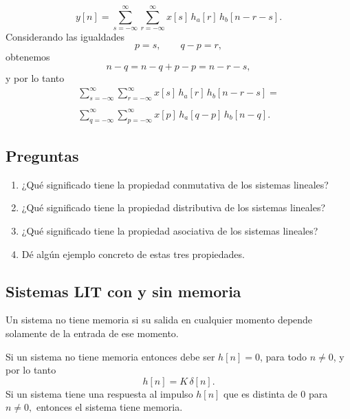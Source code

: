 \begin{equation}
 y[n] = \sum_{s=-\infty}^{\infty} \sum_{r=-\infty}^{\infty} x[s] \, h_{a}[r] \, h_{b}[n -r -s].
\end{equation}
Considerando las igualdades
\begin{equation}
 p = s, \qquad q - p = r,
\end{equation}
obtenemos
\begin{equation}
 n - q = n - q + p - p = n - r - s, 
\end{equation}
y por lo tanto
\begin{equation}
\begin{array}{c}
 \sum_{s=-\infty}^{\infty} \sum_{r=-\infty}^{\infty} x[s] \, h_{a}[r] \, h_{b}[n -r -s] = \\
 \\ 
 \sum_{q=-\infty}^{\infty} \sum_{p=-\infty}^{\infty} x[p] \, h_{a}[q - p] \, h_{b}[n -q].
\end{array}
\end{equation}


\subsection{Preguntas}

\begin{enumerate}
\item ¿Qu\'{e} significado tiene la propiedad conmutativa de los sistemas lineales?
\item ¿Qu\'{e} significado tiene la propiedad distributiva de los sistemas lineales?
\item ¿Qu\'{e} significado tiene la propiedad asociativa de los sistemas lineales?
\item D\'{e} alg\'{u}n ejemplo concreto de estas tres propiedades.
\end{enumerate}

\subsection{Sistemas LIT con y sin memoria}

Un sistema no tiene memoria si su salida en cualquier momento depende solamente de la entrada de ese momento.

Si un sistema no tiene memoria entonces debe ser $h\left[ n\right]=0$, 
para todo $n\neq 0$, y por lo tanto 
\begin{equation}
h\left[ n\right] = K \, \delta \left[ n\right] .
\end{equation}
Si un sistema tiene una respuesta al impulso $h\left[ n\right] $ que es distinta de $0$ para $n\neq 0,$ entonces el sistema tiene memoria.

